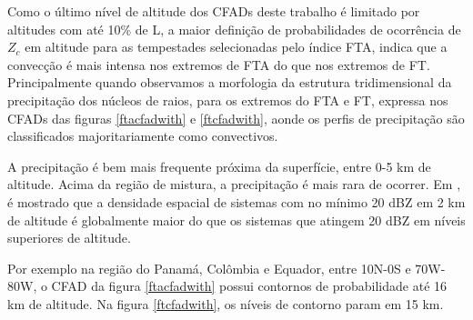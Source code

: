 
Como o último nível de altitude dos CFADs deste trabalho é limitado por altitudes com até 10\% de L, a maior definição de probabilidades de ocorrência de $Z_c$ em altitude para as tempestades selecionadas pelo índice FTA, indica que a convecção é mais intensa nos extremos de FTA do que nos extremos de FT. Principalmente quando observamos a morfologia da estrutura tridimensional da precipitação dos núcleos de raios, para os extremos do FTA e FT, expressa nos CFADs das figuras \ref{ftacfadwith} e \ref{ftcfadwith}, aonde os perfis de precipitação são classificados majoritariamente como convectivos.

A precipitação é bem mais frequente próxima da superfície, entre 0-5 km de altitude. Acima da região de mistura, a precipitação é mais rara de ocorrer. Em \cite{liu2008}, é mostrado que a densidade espacial de sistemas com no mínimo 20 dBZ em 2 km de altitude é globalmente maior do que os sistemas que atingem 20 dBZ em níveis superiores de altitude.



Por exemplo na região do Panamá, Colômbia e Equador, entre 10N-0S e 70W-80W, o CFAD da figura \ref{ftacfadwith} possui contornos de probabilidade até 16 km de altitude. Na figura \ref{ftcfadwith}, os níveis de contorno param em 15 km.

